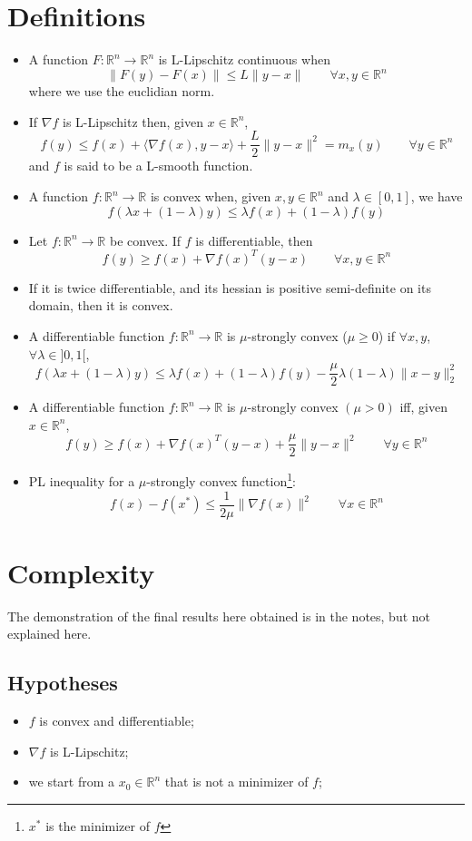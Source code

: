 \documentclass[12pt, openany]{report}
\newcommand{\R}{\mathbb{R}}
\theoremstyle{definition}
\begin{document}
\section{Definitions}
\begin{itemize}
    \item A function \(F:\mathbb{R}^n\rightarrow \mathbb{R}^n\) is L-Lipschitz continuous when \[\lVert F(y)-F(x)\rVert \le L\lVert y-x\rVert\qquad \forall x,y\in \mathbb{R}^n\]where we use the euclidian norm. 
    \item If \(\nabla f\) is L-Lipschitz then, given \(x\in \mathbb{R}^n\), \[f(y)\le f(x)+\langle \nabla f(x), y-x\rangle +\frac{L}{2}\lVert y-x\rVert^2 = m_x(y)\qquad \forall y\in \mathbb{R}^n\]and \(f\) is said to be a L-smooth function.
    \item A function \(f:\mathbb{R}^n \rightarrow \mathbb{R}\) is convex when, given \(x,y\in \mathbb{R}^n\) and \(\lambda \in [0,1]\), we have \[f(\lambda x+(1-\lambda)y)\le \lambda f(x)+(1-\lambda)f(y)\]
    \item Let \(f:\mathbb{R}^n\rightarrow\mathbb{R}\) be convex. If \(f\) is differentiable, then \[f(y) \ge f(x) + \nabla f(x)^T (y-x) \qquad \forall x,y\in \mathbb{R}^n\]
    \item If it is twice differentiable, and its hessian is positive semi-definite on its domain, then it is convex. 
    \item A differentiable function $f:\R^n\rightarrow \R$ is $\mu$-strongly convex ($\mu\ge 0$) if $\forall x,y$, $\forall \lambda \in ]0,1[$, \[f(\lambda x+(1-\lambda)y) \le \lambda f(x)+(1-\lambda)f(y)-\frac{\mu}{2}\lambda(1-\lambda)\lVert x-y\rVert^2_2\] 
    \item A differentiable function \(f:\mathbb{R}^n\rightarrow \mathbb{R}\) is \(\mu\)-strongly convex \((\mu>0)\) iff, given \(x\in \mathbb{R}^n\), \[f(y) \ge f(x) + \nabla f(x)^T(y-x) + \frac{\mu}{2}\lVert y-x\rVert^2 \qquad \forall y\in \mathbb{R}^n\]
    \item PL inequality for a \(\mu\)-strongly convex function\footnote{\(x^*\) is the minimizer of \(f\)}: \[f(x)-f(x^*)\le \frac{1}{2\mu} \lVert \nabla f(x)\rVert^2 \qquad \forall x\in \mathbb{R}^n\]
\end{itemize}
\section{Complexity}
The demonstration of the final results here obtained is in the notes, but not explained here. 
\subsection{Hypotheses}
\begin{itemize}
    \item \(f\) is convex and differentiable;
    \item \(\nabla f\) is L-Lipschitz;
    \item we start from a \(x_0\in \mathbb{R}^n\) that is not a minimizer of \(f\);
\end{itemize}
\end{document}
